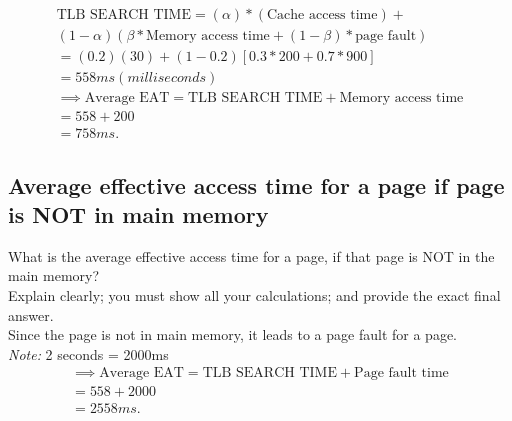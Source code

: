 \begin{align*}
    \text{TLB SEARCH TIME} =  (\alpha)*(\text{Cache access time}) + \\
    ( 1 - \alpha )(\beta * \text{Memory access time} + (1-\beta)*\text{page fault}) \\
    = (0.2)(30) + (1 - 0.2)[0.3 * 200 + 0.7 * 900] \\
    = 558 ms (milliseconds) \\
    \implies \text{Average EAT} = \text{TLB SEARCH TIME} + \text{Memory access time} \\
    = 558 + 200 \\
    = 758 ms.
\end{align*}

\subsection{Average effective access time for a page if page is NOT in main memory}
What is the average effective access time for a page, if that page is NOT in the main memory? \\
Explain clearly; you must show all your calculations; and provide the exact final answer. \\

Since the page is not in main memory, it leads to a page fault for a page. \\
\textit{Note:} 2 seconds = 2000ms
\begin{align*}
    \implies \text{Average EAT} = \text{TLB SEARCH TIME} + \text{Page fault time} \\
    = 558 + 2000 \\
    = 2558 ms.
\end{align*}
